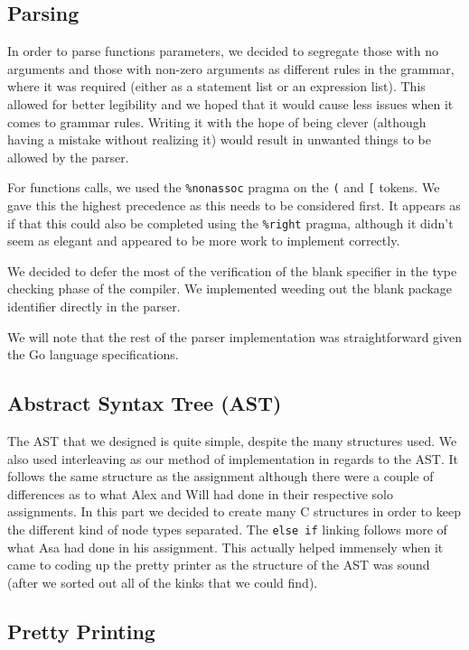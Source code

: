 \documentclass{article}
\begin{document}
\subsection{Parsing}

In order to parse functions parameters, we decided to segregate those with no arguments and
those with non-zero arguments as different rules in the grammar, where it was
required (either as a statement list or an expression list).
This allowed for better legibility and we hoped that it would
cause less issues when it comes to grammar rules. Writing it with the hope
of being clever (although having a mistake without realizing it) would result in
unwanted things to be allowed by the parser.

For functions calls, we used the
\verb|%nonassoc| pragma on the \verb|(| and \verb|[| tokens. We gave this the
highest precedence as this needs to be considered first.
It appears as if that this could also be completed using
the \verb|%right| pragma, although it didn't
seem as elegant and appeared to be more work to implement correctly.

We decided to defer the most of the verification of the blank specifier
in the type checking phase of the compiler. We implemented weeding out the blank
package identifier directly in the parser.

We will note that the rest of the parser implementation was straightforward given
the Go language specifications\cite{gotour}.

\subsection{Abstract Syntax Tree (AST)}

The AST that we designed is quite simple, despite the many structures used.
We also used interleaving as our method of implementation in regards to the AST.
It follows the same structure as the assignment although
there were a couple of differences as to what Alex and Will had done in their
respective solo assignments. In this part we decided to create many C structures
in order to keep the different kind of node types separated. The \verb|else if|
linking follows more of what Asa had done in his assignment. This actually helped
immensely when it came to coding up the pretty printer as the structure of
the AST was sound (after we sorted out all of the kinks that we could find).

\subsection{Pretty Printing}
\end{document}
